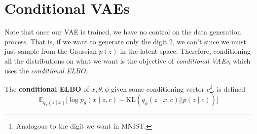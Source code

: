 \section{Conditional VAEs}

  Note that once our VAE is trained, we have no control on the data generation process. That is, if we want to generate only the digit 2, we can't since we must just sample from the Gaussian $p(z)$ in the latent space. Therefore, conditioning all the distributions on what we want is the objective of \textit{conditional VAEs}, which uses the \textit{conditional ELBO}. 

  \begin{definition}
    The \textbf{conditional ELBO} of $x, \theta, \phi$ given some conditioning vector $c$\footnote{Analogous to the digit we want in MNIST.}, is defined 
    \begin{equation}
      \mathbb{E}_{q_\phi(z \mid x)} \big[ \log p_\theta(x \mid z,c) - \mathrm{KL}(q_\phi (z \mid x,c) || p(z \mid c)) \big] 
    \end{equation}
  \end{definition}

